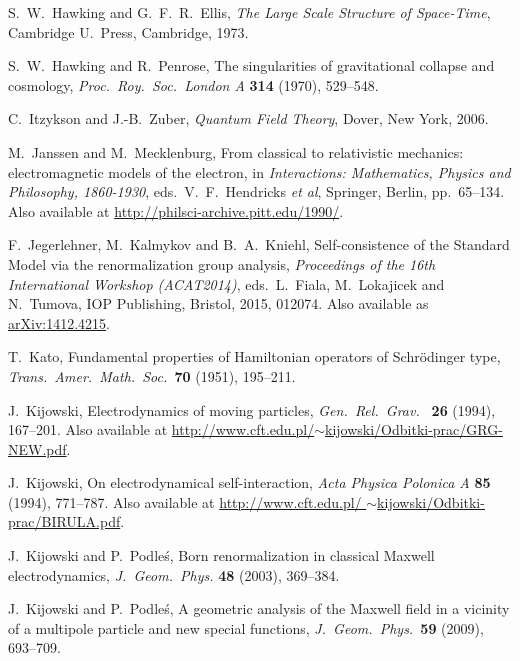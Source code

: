 \documentclass[12pt]{article}
\begin{document}
\begin{thebibliography}{10}
 S.\ W.\ Hawking and G.\ F.\ R.\ Ellis, \textsl{The Large Scale Structure of Space-Time}, Cambridge U.\ Press, Cambridge, 1973.

 S.\ W.\ Hawking and R.\ Penrose, The singularities of gravitational collapse and cosmology, \textsl{Proc.\ Roy.\ Soc.\ London A} \textbf{314} (1970), 529--548.

 C.\ Itzykson and J.-B.\ Zuber, \textsl{Quantum Field Theory}, Dover, New York, 2006.

 M.\ Janssen and M.\ Mecklenburg, From classical to relativistic mechanics: electromagnetic models of the electron, in \textsl{Interactions: Mathematics, Physics and Philosophy, 1860-1930}, eds.\ V.\ F.\ Hendricks \textit{et al}, Springer, Berlin, pp.\ 65--134.  Also available at \href{http://philsci-archive.pitt.edu/1990/}{http://philsci-archive.pitt.edu/1990/}.

 F.\ Jegerlehner, M.\ Kalmykov and B.\ A.\ Kniehl, Self-consistence of the Standard Model via the renormalization group analysis, \textsl{Proceedings of the 16th International Workshop (ACAT2014)}, eds.\ L.\ Fiala, M.\ Lokajicek and N.\ Tumova, IOP Publishing, Bristol, 2015, 012074. Also available as \href{http://arxiv.org/abs/1412.4215}{arXiv:1412.4215}.

 T.\ Kato, Fundamental properties of Hamiltonian operators of Schr\"odinger type, \textit{Trans.\ Amer.\ Math.\ Soc.\ }{\bf 70} (1951), 195--211.

 J.\ Kijowski, Electrodynamics of moving particles, 
\textsl{Gen.\ Rel.\ Grav.\ } \textbf{26} (1994), 167--201.  Also available at
\href{http://www.cft.edu.pl/~kijowski/Odbitki-prac/GRG-NEW.pdf}
{http://www.cft.edu.pl/\break $\sim$kijowski/Odbitki-prac/GRG-NEW.pdf}.

 J.\ Kijowski, On electrodynamical self-interaction, 
\textsl{Acta Physica Polonica A} \textbf{85} (1994), 771--787.
Also available at \href{http://www.cft.edu.pl/~kijowski/Odbitki-prac/BIRULA.pdf}
{http://www.cft.edu.pl/ \break $\sim$kijowski/Odbitki-prac/BIRULA.pdf}.

 J.\ Kijowski and P.\ Podle\'s, Born renormalization in classical Maxwell electrodynamics, \textsl{J.\ Geom.\ Phys.} \textbf{48} (2003), 369--384.

 J.\ Kijowski and P.\ Podle\'s, A geometric analysis of the Maxwell field in a vicinity of a multipole particle and new special functions, \textsl{J.\ Geom.\ Phys.\ }\textbf{59} (2009), 693--709.
 

\end{thebibliography}
\end{document}
